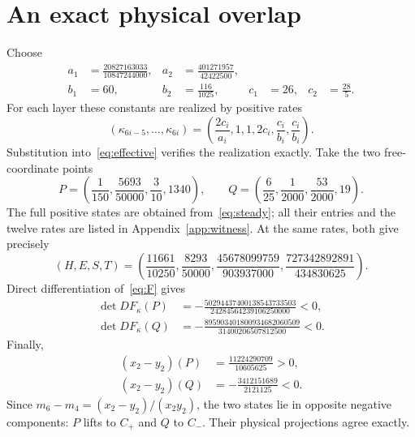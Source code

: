 \documentclass[11pt,a4paper]{article}
\numberwithin{equation}{section}
\theoremstyle{remark}\newtheorem{remark}[theorem]{Remark}
\begin{document}
\section{An exact physical overlap}\label{sec:witness}
Choose
\begin{equation}\label{eq:constants}
\begin{aligned}
a_1&=\frac{20827163033}{10847244000},&
a_2&=\frac{401271957}{42422500},\\
b_1&=60,& b_2&=\frac{116}{1025},&
c_1&=26,& c_2&=\frac{28}{5}.
\end{aligned}
\end{equation}
For each layer these constants are realized by positive rates
\begin{equation}\label{eq:ratechoice}
(\kappa_{6i-5},\ldots,\kappa_{6i})
=\left(\frac{2c_i}{a_i},1,1,2c_i,\frac{c_i}{b_i},\frac{c_i}{b_i}\right).
\end{equation}
Substitution into~\eqref{eq:effective} verifies the realization exactly. Take the two free-coordinate points
\begin{equation}\label{eq:points}
P=\left(\frac1{150},\frac{5693}{50000},\frac3{10},1340\right),\qquad
Q=\left(\frac6{25},\frac1{2000},\frac{53}{2000},19\right).
\end{equation}
The full positive states are obtained from~\eqref{eq:steady}; all their entries and the twelve rates are listed in Appendix~\ref{app:witness}. At the same rates, both give precisely
\begin{equation}\label{eq:commontotals}
(H,E,S,T)=\left(\frac{11661}{10250},\frac{8293}{50000},
\frac{45678099759}{903937000},\frac{727342892891}{434830625}\right).
\end{equation}
Direct differentiation of~\eqref{eq:F} gives
\begin{equation}\label{eq:detvalues}
\begin{aligned}
\det DF_\kappa(P)&=-\frac{50294437400138543733503}{24284564239106250000}<0,\\
\det DF_\kappa(Q)&=-\frac{895903401800934682060509}{31400206507812500}<0.
\end{aligned}
\end{equation}
Finally,
\begin{equation}\label{eq:gaps}
\begin{aligned}
(x_2-y_2)(P)&=\frac{11224290709}{10605625}>0,\\
(x_2-y_2)(Q)&=-\frac{3412151689}{2121125}<0.
\end{aligned}
\end{equation}
Since $m_6-m_4=(x_2-y_2)/(x_2y_2)$, the two states lie in opposite negative components: $P$ lifts to $C_+$ and $Q$ to $C_-$. Their physical projections agree exactly.
\end{document}
